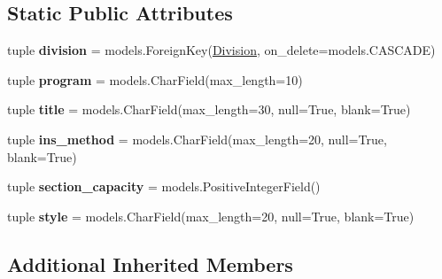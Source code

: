 \subsection*{Static Public Attributes}
\begin{DoxyCompactItemize}
\item 
\hypertarget{classscheduler_1_1models_1_1_course_a469fbc25ba99da1185556bcd2d46f1b0}{tuple {\bfseries division} = models.\-Foreign\-Key(\hyperlink{classscheduler_1_1models_1_1_division}{Division}, on\-\_\-delete=models.\-C\-A\-S\-C\-A\-D\-E)}\label{classscheduler_1_1models_1_1_course_a469fbc25ba99da1185556bcd2d46f1b0}

\item 
\hypertarget{classscheduler_1_1models_1_1_course_a6a226c9c7cf238182071b5e00796af9a}{tuple {\bfseries program} = models.\-Char\-Field(max\-\_\-length=10)}\label{classscheduler_1_1models_1_1_course_a6a226c9c7cf238182071b5e00796af9a}

\item 
\hypertarget{classscheduler_1_1models_1_1_course_a1adc8da7f3f21d51f6262caea84123d7}{tuple {\bfseries title} = models.\-Char\-Field(max\-\_\-length=30, null=True, blank=True)}\label{classscheduler_1_1models_1_1_course_a1adc8da7f3f21d51f6262caea84123d7}

\item 
\hypertarget{classscheduler_1_1models_1_1_course_adcee98a824c0827372f76dd17d342409}{tuple {\bfseries ins\-\_\-method} = models.\-Char\-Field(max\-\_\-length=20, null=True, blank=True)}\label{classscheduler_1_1models_1_1_course_adcee98a824c0827372f76dd17d342409}

\item 
\hypertarget{classscheduler_1_1models_1_1_course_a8ea6f27aab56095042c8ef51b7715341}{tuple {\bfseries section\-\_\-capacity} = models.\-Positive\-Integer\-Field()}\label{classscheduler_1_1models_1_1_course_a8ea6f27aab56095042c8ef51b7715341}

\item 
\hypertarget{classscheduler_1_1models_1_1_course_a2d8ee964882dee311d4734297cb6c91b}{tuple {\bfseries style} = models.\-Char\-Field(max\-\_\-length=20, null=True, blank=True)}\label{classscheduler_1_1models_1_1_course_a2d8ee964882dee311d4734297cb6c91b}

\end{DoxyCompactItemize}
\subsection*{Additional Inherited Members}


